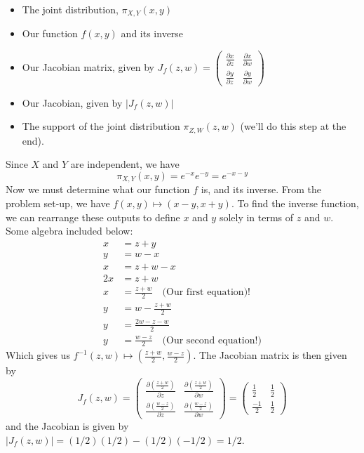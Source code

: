 \documentclass[
  letterpaper,
  DIV=11,
  numbers=noendperiod]{scrreprt}
\begin{document}
\begin{itemize}
\item
  The joint distribution, \(\pi_{X,Y}(x,y)\)
\item
  Our function \(f(x,y)\) and its inverse
\item
  Our Jacobian matrix, given by
  \(J_{f}(z,w) = \begin{pmatrix} \frac{\partial x}{\partial z} & \frac{\partial x}{\partial w} \\\frac{\partial y}{\partial z} & \frac{\partial y}{\partial w} \end{pmatrix}\)
\item
  Our Jacobian, given by \(\bigg| J_{f}(z,w) \bigg|\)
\item
  The support of the joint distribution \(\pi_{Z,W}(z,w)\) (we'll do
  this step at the end).
\end{itemize}

Since \(X\) and \(Y\) are independent, we have \[
\pi_{X,Y}(x,y) = e^{-x}e^{-y} = e^{-x - y}
\] Now we must determine what our function \(f\) is, and its inverse.
From the problem set-up, we have \(f(x, y) \longmapsto (x - y, x + y)\).
To find the inverse function, we can rearrange these outputs to define
\(x\) and \(y\) solely in terms of \(z\) and \(w\). Some algebra
included below: \begin{align*}
    x & = z + y \\
    y & = w - x \\
    x & = z + w - x \\
    2x & = z + w \\
    x & = \frac{z + w}{2} \quad \text{(Our first equation)!} \\
    y & = w - \frac{z + w}{2} \\
    y & = \frac{2w - z - w}{2} \\
    y & = \frac{w - z}{2} \quad \text{(Our second equation!)}
\end{align*} Which gives us
\(f^{-1}(z,w) \longmapsto (\frac{z + w}{2}, \frac{w - z}{2})\). The
Jacobian matrix is then given by \[
J_f(z,w) = \begin{pmatrix}
    \frac{\partial (\frac{z + w}{2})}{\partial z} & \frac{\partial (\frac{z + w}{2})}{\partial w} \\
     \frac{\partial (\frac{w - z}{2})}{\partial z} & \frac{\partial (\frac{w - z}{2})}{\partial w} 
\end{pmatrix} = \begin{pmatrix}
     \frac{1}{2} & \frac{1}{2} \\
     \frac{-1}{2} & \frac{1}{2}
     \end{pmatrix}
\] and the Jacobian is given by
\(|J_f(z,w)| = (1/2)(1/2) - (1/2)(-1/2) = 1/2\).
\end{document}
